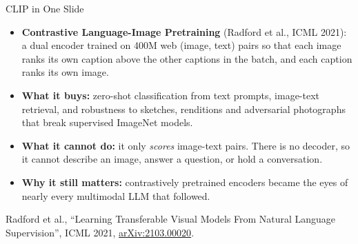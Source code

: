 \begin{frame}{CLIP in One Slide}
  \begin{itemize}
    \item[{\color{red}\textbullet}] \textbf{Contrastive Language-Image Pretraining} (Radford et al., ICML 2021): a dual
      encoder trained on 400M web (image, text) pairs so that each image ranks its own caption above
      the other captions in the batch, and each caption ranks its own image.
    \item[{\color{red}\textbullet}] \textbf{What it buys:} zero-shot classification from text prompts, image-text
      retrieval, and robustness to sketches, renditions and adversarial photographs that break
      supervised ImageNet models.
    \item[{\color{red}\textbullet}] \textbf{What it cannot do:} it only \emph{scores} image-text pairs. There is no
      decoder, so it cannot describe an image, answer a question, or hold a conversation.
    \item[{\color{red}\textbullet}] \textbf{Why it still matters:} contrastively pretrained encoders became the eyes
      of nearly every multimodal LLM that followed.
  \end{itemize}
  \vspace{0.4em}
  {\scriptsize Radford et al., ``Learning Transferable Visual Models From Natural Language Supervision'',
  ICML 2021, \href{https://arxiv.org/abs/2103.00020}{arXiv:2103.00020}.}
\end{frame}


